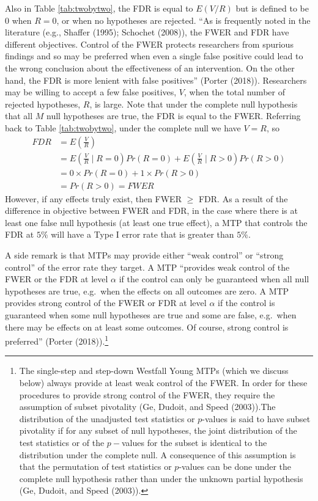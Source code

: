 \documentclass{article}
\begin{document}
Also in Table \ref{tab:twobytwo}, the FDR is equal to \(E(V/R)\) but is
defined to be \(0\) when \(R=0\), or when no hypotheses are rejected.
``As is frequently noted in the literature (e.g., Shaffer (1995);
Schochet (2008)), the FWER and FDR have different objectives. Control of
the FWER protects researchers from spurious findings and so may be
preferred when even a single false positive could lead to the wrong
conclusion about the effectiveness of an intervention. On the other
hand, the FDR is more lenient with false positives'' (Porter (2018)).
Researchers may be willing to accept a few false positives, \(V\), when
the total number of rejected hypotheses, \(R\), is large. Note that
under the complete null hypothesis that all \(M\) null hypotheses are
true, the FDR is equal to the FWER. Referring back to Table
\ref{tab:twobytwo}, under the complete null we have \(V = R\), so
\begin{align*}
FDR &= E\left(\frac{V}{R}\right)\\
&=  E\left(\frac{V}{R}\mid R = 0\right) Pr(R = 0) + E\left(\frac{V}{R} \mid R > 0\right)Pr(R > 0) \\
&= 0 \times Pr(R = 0) + 1 \times Pr(R > 0) \\
&= Pr(R > 0) = FWER
\end{align*} However, if any effects truly exist, then FWER \(\geq\)
FDR. As a result of the difference in objective between FWER and FDR, in
the case where there is at least one false null hypothesis (at least one
true effect), a MTP that controls the FDR at \(5\%\) will have a Type I
error rate that is greater than \(5\%\).

A side remark is that MTPs may provide either ``weak control'' or
``strong control'' of the error rate they target. A MTP ``provides weak
control of the FWER or the FDR at level \(\alpha\) if the control can
only be guaranteed when all null hypotheses are true, e.g.~when the
effects on all outcomes are zero. A MTP provides strong control of the
FWER or FDR at level \(\alpha\) if the control is guaranteed when some
null hypotheses are true and some are false, e.g.~when there may be
effects on at least some outcomes. Of course, strong control is
preferred'' (Porter (2018)).\footnote{The single-step and step-down
  Westfall Young MTPs (which we discuss below) always provide at least
  weak control of the FWER. In order for these procedures to provide
  strong control of the FWER, they require the assumption of subset
  pivotality (Ge, Dudoit, and Speed (2003)).The distribution of the
  unadjusted test statistics or \(p\)-values is said to have subset
  pivotality if for any subset of null hypotheses, the joint
  distribution of the test statistics or of the \(p-\)values for the
  subset is identical to the distribution under the complete null. A
  consequence of this assumption is that the permutation of test
  statistics or \(p\)-values can be done under the complete null
  hypothesis rather than under the unknown partial hypothesis (Ge,
  Dudoit, and Speed (2003)).}
\end{document}
